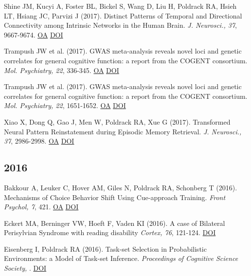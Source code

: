 Shine JM, Kucyi A, Foster BL, Bickel S, Wang D, Liu H, Poldrack RA, Hsieh LT, Hsiang JC, Parvizi J (2017). Distinct Patterns of Temporal and Directional Connectivity among Intrinsic Networks in the Human Brain. \textit{J. Neurosci., 37}, 9667-9674. \href{https://www.ncbi.nlm.nih.gov/pmc/articles/PMC6596608}{OA} \href{http://dx.doi.org/10.1523/jneurosci.1574-17.2017}{DOI} \vspace{2mm}

Trampush JW et al. (2017). GWAS meta-analysis reveals novel loci and genetic correlates for general cognitive function: a report from the COGENT consortium. \textit{Mol. Psychiatry, 22}, 336-345. \href{https://www.ncbi.nlm.nih.gov/pmc/articles/PMC5322272}{OA} \href{http://dx.doi.org/10.1038/mp.2016.244}{DOI} \vspace{2mm}

Trampush JW et al. (2017). GWAS meta-analysis reveals novel loci and genetic correlates for general cognitive function: a report from the COGENT consortium. \textit{Mol. Psychiatry, 22}, 1651-1652. \href{https://www.ncbi.nlm.nih.gov/pmc/articles/PMC5659072}{OA} \href{http://dx.doi.org/10.1038/mp.2017.197}{DOI} \vspace{2mm}

Xiao X, Dong Q, Gao J, Men W, Poldrack RA, Xue G (2017). Transformed Neural Pattern Reinstatement during Episodic Memory Retrieval. \textit{J. Neurosci., 37}, 2986-2998. \href{https://www.ncbi.nlm.nih.gov/pmc/articles/PMC6596730}{OA} \href{http://dx.doi.org/10.1523/jneurosci.2324-16.2017}{DOI} \vspace{2mm}

\subsection*{2016}

Bakkour A, Leuker C, Hover AM, Giles N, Poldrack RA, Schonberg T (2016). Mechanisms of Choice Behavior Shift Using Cue-approach Training. \textit{Front Psychol, 7}, 421. \href{https://www.ncbi.nlm.nih.gov/pmc/articles/PMC4804288}{OA} \href{http://dx.doi.org/10.3389/fpsyg.2016.00421}{DOI} \vspace{2mm}

Eckert MA, Berninger VW, Hoeft F, Vaden KI (2016). A case of Bilateral Perisylvian Syndrome with reading disability \textit{Cortex, 76}, 121-124. \href{http://dx.doi.org/10.1016/j.cortex.2016.01.004}{DOI} \vspace{2mm}

Eisenberg I, Poldrack RA (2016). Task-set Selection in Probabilistic Environments: a Model of Task-set Inference. \textit{Proceedings of Cognitive Science Society, }. \href{http://dx.doi.org/lorafmrm}{DOI} \vspace{2mm}

